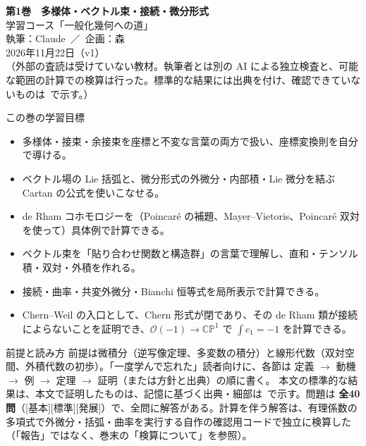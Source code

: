 
\usepackage{tikz}
\usepackage{tikz-cd}
\usetikzlibrary{arrows.meta,calc,decorations.markings}
\newcommand{\dd}{\mathrm{d}}
\newcommand{\Lie}{\mathcal L}
\newcommand{\tr}{\mathrm{tr}}
\newcommand{\GL}{\mathrm{GL}}
\newcommand{\U}{\mathrm{U}}
\newcommand{\SO}{\mathrm{SO}}
\newcommand{\Om}{\Omega}
\newcommand{\X}{\mathfrak X}
\newcommand{\Gam}{\Gamma}
\newcommand{\pa}{\partial}
\newcommand{\Ad}{\mathrm{Ad}}
\newcommand{\RP}{\mathbb{RP}}
\newcommand{\CP}{\mathbb{CP}}
\newcommand{\bs}{\boldsymbol}
\renewcommand{\Re}{\operatorname{Re}}
\renewcommand{\Im}{\operatorname{Im}}
\DeclareMathOperator{\rank}{rank}
\newfontfamily{}
\newcommand{\Cech}{{\Lat \v{C}ech}}
\renewcommand{\contentsname}{目次}\renewcommand{\figurename}{図}

\sloppy
\begin{center}
{\LARGE\bfseries\sffamily 第1巻　多様体・ベクトル束・接続・微分形式}\\[8pt]
{\large 学習コース「一般化幾何への道」}\\[6pt]
{\large 執筆：Claude\ ／\ 企画：森}\\[3pt]
2026年11月22日（v1）\\[3pt]
{\small （外部の査読は受けていない教材。執筆者とは別の AI による独立検査と、可能な範囲の計算での検算は行った。標準的な結果には出典を付け、確認できていないものは\tQ\ で示す。）}
\end{center}
\medskip
\begin{goalbox}{この巻の学習目標}
\begin{itemize}
\item 多様体・接束・余接束を座標と不変な言葉の両方で扱い、座標変換則を自分で導ける。
\item ベクトル場の Lie 括弧と、微分形式の外微分・内部積・Lie 微分を結ぶ Cartan の公式を使いこなせる。
\item de Rham コホモロジーを（Poincar\'e の補題、Mayer--Vietoris、Poincar\'e 双対を使って）具体例で計算できる。
\item ベクトル束を「貼り合わせ関数と構造群」の言葉で理解し、直和・テンソル積・双対・外積を作れる。
\item 接続・曲率・共変外微分・Bianchi 恒等式を局所表示で計算できる。
\item Chern--Weil の入口として、Chern 形式が閉であり、その de Rham 類が接続によらないことを証明でき、$\mathcal O(-1)\to\CP^1$ で $\int c_1=-1$ を計算できる。
\end{itemize}
\end{goalbox}
\begin{keybox}{前提と読み方}
前提は微積分（逆写像定理、多変数の積分）と線形代数（双対空間、外積代数の初歩）。「一度学んで忘れた」読者向けに、各節は 定義 $\to$ 動機 $\to$ 例 $\to$ 定理 $\to$ 証明（または方針と出典）の順に書く。
本文の標準的な結果は\tC、本文で証明したものは\tP、記憶に基づく出典・細部は\tQ\ で示す。問題は \textbf{全40問}（[基本][標準][発展]）で、全問に解答がある。計算を伴う解答は、有理係数の多項式で外微分・括弧・曲率を実行する自作の確認用コードで独立に検算した（「報告」ではなく、巻末の「検算について」を参照）。
\end{keybox}
\tableofcontents
\clearpage

